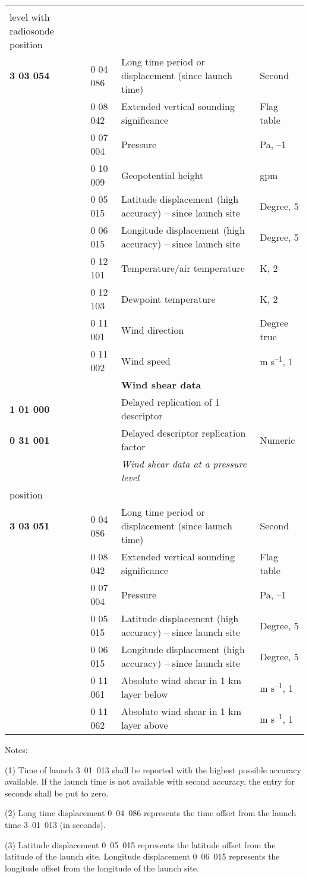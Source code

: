 \begin{longtable}[]{@{}llll@{}}
& & \emph{Temperature, dewpoint and wind data at a pressure\\
level with radiosonde position} &\tabularnewline
\textbf{3 03 054} & 0 04 086 & Long time period or displacement (since launch time) & Second\tabularnewline
& 0 08 042 & Extended vertical sounding significance & Flag table\tabularnewline
& 0 07 004 & Pressure & Pa, --1\tabularnewline
& 0 10 009 & Geopotential height & gpm\tabularnewline
& 0 05 015 & Latitude displacement (high accuracy) -- since launch site & Degree, 5\tabularnewline
& 0 06 015 & Longitude displacement (high accuracy) -- since launch site & Degree, 5\tabularnewline
& 0 12 101 & Temperature/air temperature & K, 2\tabularnewline
& 0 12 103 & Dewpoint temperature & K, 2\tabularnewline
& 0 11 001 & Wind direction & Degree true\tabularnewline
& 0 11 002 & Wind speed & m s\textsuperscript{--1}, 1\tabularnewline
& & \textbf{Wind shear data} &\tabularnewline
\textbf{1 01 000} & & Delayed replication of 1 descriptor &\tabularnewline
\textbf{0 31 001} & & Delayed descriptor replication factor & Numeric\tabularnewline
& & \emph{Wind shear data at a pressure level} \emph{\textbf{with radiosonde\\
position}} &\tabularnewline
\textbf{3 03 051} & 0 04 086 & Long time period or displacement (since launch time) & Second\tabularnewline
& 0 08 042 & Extended vertical sounding significance & Flag table\tabularnewline
& 0 07 004 & Pressure & Pa, --1\tabularnewline
& 0 05 015 & Latitude displacement (high accuracy) -- since launch site & Degree, 5\tabularnewline
& 0 06 015 & Longitude displacement (high accuracy) -- since launch site & Degree, 5\tabularnewline
& 0 11 061 & Absolute wind shear in 1 km layer below & m s\textsuperscript{--1}, 1\tabularnewline
& 0 11 062 & Absolute wind shear in 1 km layer above & m s\textsuperscript{--1}, 1\tabularnewline
\bottomrule
\end{longtable}

Notes:

(1) Time of launch 3~01~013 shall be reported with the highest possible accuracy available. If the launch time is not available with second accuracy, the entry for seconds shall be put to zero.

(2) Long time displacement 0~04~086 represents the time offset from the launch time 3~01~013 (in seconds).

(3) Latitude displacement 0~05~015 represents the latitude offset from the latitude of the launch site. Longitude displacement 0~06~015 represents the longitude offset from the longitude of the launch site.


